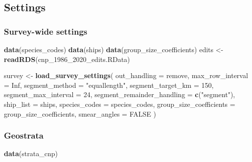 \documentclass[
]{book}
\newenvironment{Shaded}{\begin{snugshade}}{\end{snugshade}}
\newcommand{\AttributeTok}[1]{\textcolor[rgb]{0.13,0.29,0.53}{#1}}
\newcommand{\ConstantTok}[1]{\textcolor[rgb]{0.56,0.35,0.01}{#1}}
\newcommand{\DecValTok}[1]{\textcolor[rgb]{0.00,0.00,0.81}{#1}}
\newcommand{\FunctionTok}[1]{\textcolor[rgb]{0.13,0.29,0.53}{\textbf{#1}}}
\newcommand{\NormalTok}[1]{#1}
\newcommand{\OtherTok}[1]{\textcolor[rgb]{0.56,0.35,0.01}{#1}}
\newcommand{\StringTok}[1]{\textcolor[rgb]{0.31,0.60,0.02}{#1}}
\begin{document}
\hypertarget{settings-1}{%
\subsection*{Settings}\label{settings-1}}

\hypertarget{survey-wide-settings-2}{%
\subsubsection*{Survey-wide settings}\label{survey-wide-settings-2}}

\begin{Shaded}
\begin{Highlighting}[]
\FunctionTok{data}\NormalTok{(species\_codes)}
\FunctionTok{data}\NormalTok{(ships)}
\FunctionTok{data}\NormalTok{(group\_size\_coefficients)}
\NormalTok{edits }\OtherTok{\textless{}{-}} \FunctionTok{readRDS}\NormalTok{(}\StringTok{\textquotesingle{}cnp\_1986\_2020\_edits.RData\textquotesingle{}}\NormalTok{)}

\NormalTok{survey }\OtherTok{\textless{}{-}} \FunctionTok{load\_survey\_settings}\NormalTok{(}
  \AttributeTok{out\_handling =} \StringTok{\textquotesingle{}remove\textquotesingle{}}\NormalTok{,}
  \AttributeTok{max\_row\_interval =} \ConstantTok{Inf}\NormalTok{,}
  \AttributeTok{segment\_method =} \StringTok{"equallength"}\NormalTok{,}
  \AttributeTok{segment\_target\_km =} \DecValTok{150}\NormalTok{,}
  \AttributeTok{segment\_max\_interval =} \DecValTok{24}\NormalTok{,}
  \AttributeTok{segment\_remainder\_handling =} \FunctionTok{c}\NormalTok{(}\StringTok{"segment"}\NormalTok{),}
  \AttributeTok{ship\_list =}\NormalTok{ ships,}
  \AttributeTok{species\_codes =}\NormalTok{ species\_codes,}
  \AttributeTok{group\_size\_coefficients =}\NormalTok{ group\_size\_coefficients,}
  \AttributeTok{smear\_angles =} \ConstantTok{FALSE}
\NormalTok{)}
\end{Highlighting}
\end{Shaded}

\hypertarget{geostrata-1}{%
\subsubsection*{Geostrata}\label{geostrata-1}}

\begin{Shaded}
\begin{Highlighting}[]
\FunctionTok{data}\NormalTok{(strata\_cnp)}
\end{Highlighting}
\end{Shaded}
\end{document}
